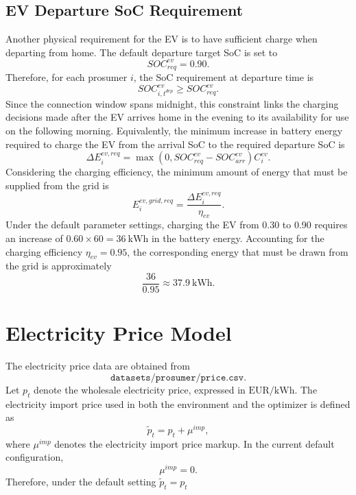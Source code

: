 \subsection{EV Departure SoC Requirement}

Another physical requirement for the EV is to have sufficient charge when departing from home. The default departure target SoC is set to
\[
  SOC^{ev}_{req}=0.90.
\]
Therefore, for each prosumer \(i\), the SoC requirement at departure time is
\[
  SOC^{ev}_{i,t^{dep}}\ge SOC^{ev}_{req}.
\]
Since the connection window spans midnight, this constraint links the charging decisions made after the EV arrives home in the evening to its availability for use on the following morning. Equivalently, the minimum increase in battery energy required to charge the EV from the arrival SoC to the required departure SoC is
\[
  \Delta E^{ev,req}_i
  =
  \max(0,SOC^{ev}_{req}-SOC^{ev}_{arr})C^{ev}_i.
\]
Considering the charging efficiency, the minimum amount of energy that must be supplied from the grid is
\[
  E^{ev,grid,req}_i
  =
  \frac{\Delta E^{ev,req}_i}{\eta_{ev}}.
\]
Under the default parameter settings, charging the EV from 0.30 to 0.90 requires an increase of \(0.60\times 60=36\ \mathrm{kWh}\) in the battery energy. Accounting for the charging efficiency \(\eta_{ev}=0.95\), the corresponding energy that must be drawn from the grid is approximately
\[
  \frac{36}{0.95}\approx 37.9\ \mathrm{kWh}.
\]

\section{Electricity Price Model}

The electricity price data are obtained from
\[
  \texttt{datasets/prosumer/price.csv}.
\]
Let \(p_t\) denote the wholesale electricity price, expressed in \(\mathrm{EUR/kWh}\). The electricity import price used in both the environment and the optimizer is defined as
\[
  \tilde p_t=p_t+\mu^{imp},
\]
where \(\mu^{imp}\) denotes the electricity import price markup. In the current default configuration,
\[
  \mu^{imp}=0.
\]
Therefore, under the default setting
 \(\tilde p_t=p_t\)

